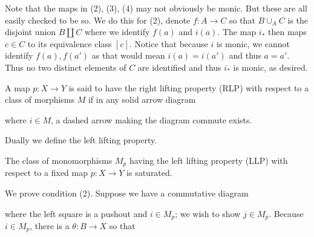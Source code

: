 \edefn

Note that the maps in (2), (3), (4) may not obviously be monic.
But these are all easily checked to be so.
We do this for (2), denote $f\colon A\to C$ so that $B\cup_AC$ is the disjoint union $B\amalg C$ where we identify
$f(a)$ and $i(a)$.
The map $i_*$ then maps $c\in C$ to its equivalence class $[c]$.
Notice that because $i$ is monic, we cannot identify $f(a),f(a')$ as that would mean $i(a)=i(a')$ and thus $a=a'$.
Thus no two distinct elements of $C$ are identified and thus $i_*$ is monic, as desired.

\bdefn

    A map $p\colon X\to Y$ is said to have the {\emphcolor right lifting property} ({\emphcolor RLP}) with respect to a class
    of morphisms $M$ if in any solid arrow diagram

    \centerline{}

    where $i\in M$, a dashed arrow making the diagram commute exists.

    Dually we define the {\emphcolor left lifting property}.

\edefn

\blemm

    The class of monomorphisms $M_p$ having the left lifting property (LLP) with respect to a fixed map $p\colon X\to Y$
    is saturated.

\elemm

\bproof

    We prove condition (2).
    Suppose we have a commutative diagram

    \centerline{}

    where the left square is a pushout and $i\in M_p$; we wish to show $j\in M_p$.
    Because $i\in M_p$, there is a $\theta\colon B\to X$ so that


